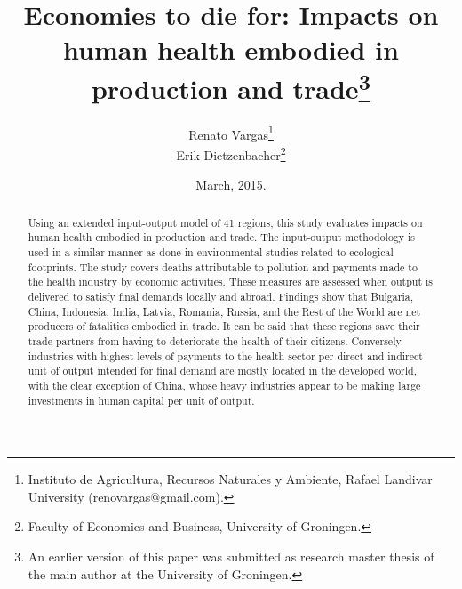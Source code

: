 \documentclass[a4paper,12pt]{article}
\begin{document}
 



\title{Economies to die for: Impacts on human health embodied in production and trade\thanks{An earlier version of this paper was submitted as research master thesis of the main author at the University of Groningen.}} 
\author{Renato Vargas\thanks{Instituto de Agricultura, Recursos Naturales y Ambiente, Rafael Landivar University \mbox{(renovargas@gmail.com)}.} \\ Erik Dietzenbacher\thanks{Faculty of Economics and Business, University of Groningen.}} 

\date{March, 2015.} 

\maketitle

\begin{abstract} 
Using an extended input-output model of 41 regions, this study evaluates impacts on human health embodied in production and trade. The input-output methodology is used in a similar manner as done in environmental studies related to ecological footprints. The study covers deaths attributable to pollution and payments made to the health industry by economic activities. These measures are assessed when output is delivered to satisfy final demands locally and abroad. Findings show that Bulgaria, China, Indonesia, India, Latvia, Romania, Russia, and the Rest of the World are net producers of fatalities embodied in trade. It can be said that these regions save their trade partners from having to deteriorate the health of their citizens. Conversely, industries with highest levels of payments to the health sector per direct and indirect unit of output intended for final demand are mostly located in the developed world, with the clear exception of China, whose heavy industries appear to be making large investments in human capital per unit of output. 

\end{abstract}
\end{document}

